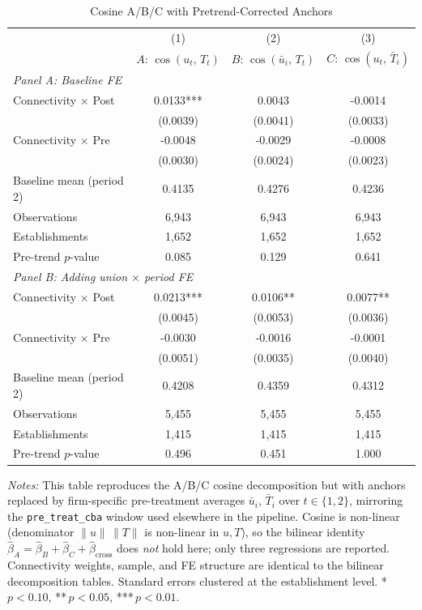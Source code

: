 \begin{table}[H]
\centering
\caption{Cosine A/B/C with Pretrend-Corrected Anchors}
\label{tab:cosine_pretrend_anchored}
\scriptsize
\setlength{\tabcolsep}{8pt}
\begin{tabular}{lccc}
\hline\hline
 & (1) & (2) & (3) \\
 & \textbf{$A:\,\cos(u_t,\,T_t)$} & \textbf{$B:\,\cos(\bar u_i,\,T_t)$} & \textbf{$C:\,\cos(u_t,\,\bar T_i)$} \\
\hline
\multicolumn{4}{l}{\textit{Panel A: Baseline FE}} \\
Connectivity $\times$ Post & 0.0133*** & 0.0043 & -0.0014 \\
 & (0.0039) & (0.0041) & (0.0033) \\
Connectivity $\times$ Pre & -0.0048 & -0.0029 & -0.0008 \\
 & (0.0030) & (0.0024) & (0.0023) \\
Baseline mean (period 2) & 0.4135 & 0.4276 & 0.4236 \\
Observations & 6,943 & 6,943 & 6,943 \\
Establishments & 1,652 & 1,652 & 1,652 \\
Pre-trend $p$-value & 0.085 & 0.129 & 0.641 \\
\hline
\multicolumn{4}{l}{\textit{Panel B: Adding union $\times$ period FE}} \\
Connectivity $\times$ Post & 0.0213*** & 0.0106** & 0.0077** \\
 & (0.0045) & (0.0053) & (0.0036) \\
Connectivity $\times$ Pre & -0.0030 & -0.0016 & -0.0001 \\
 & (0.0051) & (0.0035) & (0.0040) \\
Baseline mean (period 2) & 0.4208 & 0.4359 & 0.4312 \\
Observations & 5,455 & 5,455 & 5,455 \\
Establishments & 1,415 & 1,415 & 1,415 \\
Pre-trend $p$-value & 0.496 & 0.451 & 1.000 \\
\hline
\hline\hline
\end{tabular}
\begin{minipage}{\linewidth}
\smallskip
\scriptsize\textit{Notes:} This table reproduces the A/B/C cosine decomposition but with anchors replaced by firm-specific pre-treatment averages $\bar u_i$, $\bar T_i$ over $t \in \{1,2\}$, mirroring the \texttt{pre\_treat\_cba} window used elsewhere in the pipeline. Cosine is non-linear (denominator $\lVert u\rVert\,\lVert T\rVert$ is non-linear in $u, T$), so the bilinear identity $\hat\beta_A = \hat\beta_B + \hat\beta_C + \hat\beta_{\text{cross}}$ does \emph{not} hold here; only three regressions are reported. Connectivity weights, sample, and FE structure are identical to the bilinear decomposition tables. Standard errors clustered at the establishment level. *\,$p<0.10$, **\,$p<0.05$, ***\,$p<0.01$.
\end{minipage}
\end{table}
